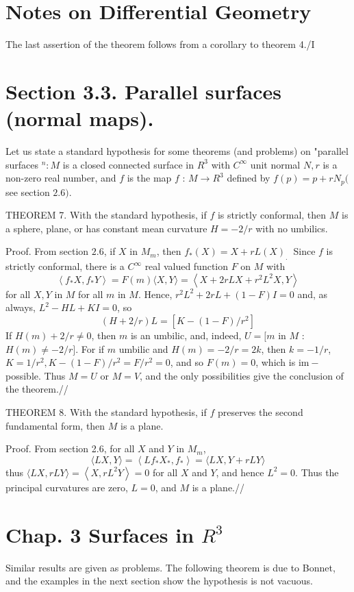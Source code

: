 \documentclass[10pt]{article}
\begin{document}
\section{Notes on Differential Geometry}
The last assertion of the theorem follows from a corollary to theorem 4./I

\section{Section 3.3. Parallel surfaces (normal maps).}
Let us state a standard hypothesis for some theorems (and problems) on "parallel surfaces ${ }^{n}: M$ is a closed connected surface in $R^{3}$ with $C^{\infty}$ unit normal $N, r$ is a non-zero real number, and $f$ is the map $f$ : $M \rightarrow R^{3}$ defined by $f(p)=p+r N_{p}($ see section $2.6)$.

THEOREM 7. With the standard hypothesis, if $f$ is strictly conformal, then $M$ is a sphere, plane, or has constant mean curvature $H=-2 / r$ with no umbilics.

Proof. From section $2.6$, if $X$ in $M_{m}$, then $f_{*}(X)=X+r L(X)_{\text {. }}$ Since $f$ is strictly conformal, there is a $C^{\infty}$ real valued function $F$ on $M$ with
$$
\left\langle f_{*} X, f_{*} Y\right\rangle=F(m)\langle X, Y\rangle=\left\langle X+2 r L X+r^{2} L^{2} X, Y\right\rangle
$$
for all $X, Y$ in $M$ for all $m$ in $M$. Hence, $r^{2} L^{2}+2 r L+(1-F) I=0$ and, as always, $L^{2}-H L+K I=0$, so
$$
(H+2 / r) L=\left[K-(1-F) / r^{2}\right]
$$
If $H(m)+2 / r \neq 0$, then $m$ is an umbilic, and, indeed, $U=[m$ in $M$ : $H(m) \neq-2 / r]$. For if $m$ umbilic and $H(m)=-2 / r=2 k$, then $k=-1 / r$, $K=1 / r^{2}, K-(1-F) / r^{2}=F / r^{2}=0$, and so $F(m)=0$, which is $\mathrm{im}-$ possible. Thus $M=U$ or $M=V$, and the only possibilities give the conclusion of the theorem.//

THEOREM 8. With the standard hypothesis, if $f$ preserves the second fundamental form, then $M$ is a plane.

Proof. From section 2.6, for all $X$ and $Y$ in $M_{m}$,
$$
\langle L X, Y\rangle=\left\langle L f_{*} X_{*}, f_{*}\right\rangle=\langle L X, Y+r L Y\rangle
$$
thus $\langle L X, r L Y\rangle=\left\langle X, r L^{2} Y\right\rangle=0$ for all $X$ and $Y$, and hence $L^{2}=0$. Thus the principal curvatures are zero, $L=0$, and $M$ is a plane.//

\section{Chap. 3 Surfaces in $R^{3}$}
Similar results are given as problems. The following theorem is due to Bonnet, and the examples in the next section show the hypothesis is not vacuous.
\end{document}
